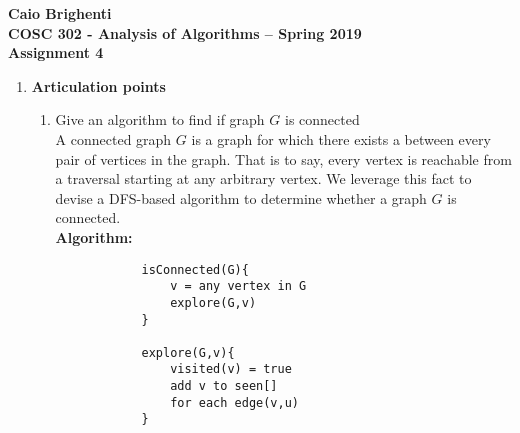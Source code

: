 \documentclass{article}
\begin{document}
\noindent \textbf{Caio Brighenti }\\
\noindent \textbf{COSC 302 - Analysis of Algorithms -- Spring 2019}\\%
\noindent \textbf{Assignment 4}\vspace{1em}\\
\begin{enumerate}
	\item \textbf{Articulation points}
	\begin{enumerate}
		\item Give an algorithm to find if graph $G$ is connected
		\\ A connected graph $G$ is a graph for which there exists a between every pair of vertices in the graph. That is to say, every vertex is reachable from a traversal starting at any arbitrary vertex. We leverage this fact to devise a DFS-based algorithm to determine whether a graph $G$ is connected.
		\\ \textbf{Algorithm:}
		\begin{lstlisting}
			isConnected(G){
				v = any vertex in G
				explore(G,v)			
			}
			
			explore(G,v){
				visited(v) = true
				add v to seen[]
				for each edge(v,u)	
			}
		\end{lstlisting}
	\end{enumerate}
\end{enumerate}
	
\end{document}
